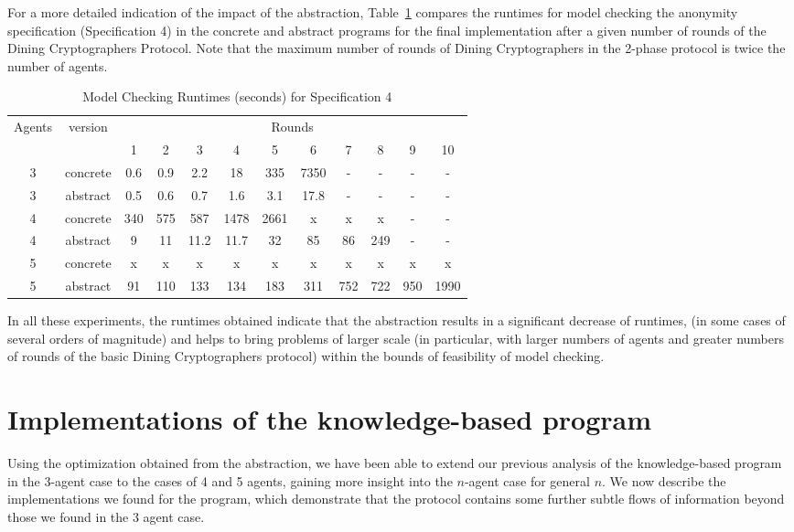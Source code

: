 \documentclass[]{llncs}
\begin{document}
For a more detailed indication of the impact of the abstraction, 
Table~\ref{table:results-rounds} compares the runtimes for model checking the anonymity specification  
(Specification 4) in the concrete and abstract programs for the final implementation after a given number of rounds
of the Dining Cryptographers Protocol. Note that the maximum number of rounds of Dining Cryptographers 
in the 2-phase protocol is twice the number of agents. 

\begin{table}[h]
\begin{center} 
\begin{tabular}{|c|c||c|c|c|c|c|c|c|c|c|c|} 
\hline 
\multirow{2}{1cm}{Agents}& \multirow{2}{1cm}{version}& \multicolumn{10}{c|}{Rounds} \\  
 & & 1 & 2 & 3 & 4 & 5 & 6 & 7 & 8 & 9 & 10 \\ 
\hline 
 3 & concrete & 0.6&0.9& 2.2& 18&335&7350&- &- &- & - \\ 
  3 & abstract &0.5& 0.6&0.7&1.6& 3.1& 17.8&- &- &- & - \\ 
  \hline
 4 & concrete  &340& 575&587&1478&2661&x& x& x&- & - \\ 
  4 & abstract &9&11&11.2&11.7& 32& 85& 86 &249 &- & - \\ 
  \hline 
   5 & concrete &x&x&x&x&x&x& x& x& x&x \\ 
 5 & abstract   &91& 110& 133& 134& 183& 311& 752& 722& 950& 1990\\ 
\hline 
\end{tabular} 
\end{center} 
\caption{Model Checking Runtimes (seconds) for Specification 4 \label{table:results-rounds}}
\end{table} 

In all these experiments, the runtimes obtained indicate that the abstraction results in 
a significant decrease of runtimes, (in some cases of several orders of magnitude) 
and helps to bring problems of larger scale (in particular, with larger numbers of agents 
and greater numbers of rounds of the basic Dining Cryptographers protocol) within the bounds of 
feasibility of model checking.  

\section{Implementations of  the knowledge-based program}\label{sec:imp-results} 

Using the optimization obtained from the abstraction, we have been able to extend 
our previous analysis of the knowledge-based program in the 3-agent case 
to the cases of 4 and 5 agents, gaining more insight into the $n$-agent case for general $n$. 
We now describe the implementations we found for the program, 
which demonstrate that the protocol contains some further subtle flows
of information beyond those we found in the 3 agent case. 
\end{document}
